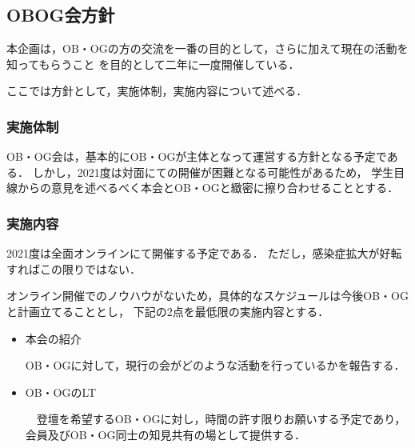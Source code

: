 \subsection*{OBOG会方針}


本企画は，OB・OGの方の交流を一番の目的として，さらに加えて現在の活動を知ってもらうこと
を目的として二年に一度開催している．

ここでは方針として，実施体制，実施内容について述べる．

\subsubsection*{実施体制}

OB・OG会は，基本的にOB・OGが主体となって運営する方針となる予定である．
しかし，2021度は対面にての開催が困難となる可能性があるため，
学生目線からの意見を述べるべく本会とOB・OGと緻密に擦り合わせることとする．

\subsubsection*{実施内容}

2021度は全面オンラインにて開催する予定である．
ただし，感染症拡大が好転すればこの限りではない．

オンライン開催でのノウハウがないため，具体的なスケジュールは今後OB・OGと計画立てることとし，
下記の2点を最低限の実施内容とする．

\begin{itemize}
    \item 本会の紹介

        OB・OGに対して，現行の会がどのような活動を行っているかを報告する．
    \item OB・OGのLT

        　登壇を希望するOB・OGに対し，時間の許す限りお願いする予定であり，会員及びOB・OG同士の知見共有の場として提供する．
\end{itemize}

